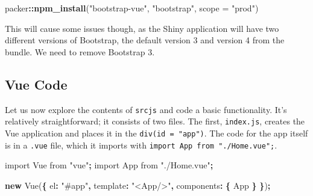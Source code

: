 \documentclass[10pt,]{krantz}
\makeatletter
\newenvironment{Shaded}{\begin{snugshade}}{\end{snugshade}}
\newcommand{\AttributeTok}[1]{\textcolor[rgb]{0.61,0.61,0.61}{#1}}
\newcommand{\CommentTok}[1]{\textcolor[rgb]{0.37,0.37,0.37}{\textit{#1}}}
\newcommand{\ControlFlowTok}[1]{\textcolor[rgb]{0.27,0.27,0.27}{\textbf{#1}}}
\newcommand{\DataTypeTok}[1]{\textcolor[rgb]{0.27,0.27,0.27}{#1}}
\newcommand{\ImportTok}[1]{#1}
\newcommand{\KeywordTok}[1]{\textcolor[rgb]{0.27,0.27,0.27}{\textbf{#1}}}
\newcommand{\NormalTok}[1]{#1}
\newcommand{\OperatorTok}[1]{\textcolor[rgb]{0.43,0.43,0.43}{\textbf{#1}}}
\newcommand{\StringTok}[1]{\textcolor[rgb]{0.5,0.5,0.5}{#1}}
\newenvironment{kframe}{%
\medskip{}
\setlength{\fboxsep}{.8em}
 \def\at@end@of@kframe{}%
 \ifinner\ifhmode%
  \def\at@end@of@kframe{\end{minipage}}%
  \begin{minipage}{\columnwidth}%
 \fi\fi%
 \def\FrameCommand##1{\hskip\@totalleftmargin \hskip-\fboxsep
 \colorbox{shadecolor}{##1}\hskip-\fboxsep
     \hskip-\linewidth \hskip-\@totalleftmargin \hskip\columnwidth}%
 \MakeFramed {\advance\hsize-\width
   \@totalleftmargin\z@ \linewidth\hsize
   \@setminipage}}%
 {\par\unskip\endMakeFramed%
 \at@end@of@kframe}
\renewenvironment{Shaded}{\begin{kframe}}{\end{kframe}}
\makeatother
\begin{document}
\begin{Shaded}
\begin{Highlighting}[]
\NormalTok{packer}\OperatorTok{::}\KeywordTok{npm_install}\NormalTok{(}\StringTok{"bootstrap-vue"}\NormalTok{, }\StringTok{"bootstrap"}\NormalTok{, }\DataTypeTok{scope =} \StringTok{"prod"}\NormalTok{)}
\end{Highlighting}
\end{Shaded}

This will cause some issues though, as the Shiny application will have two different versions of Bootstrap, the default version 3 and version 4 from the bundle. We need to remove Bootstrap 3.

\begin{Shaded}
\end{Shaded}

\hypertarget{packer-adv-shiny-vue-code}{%
\subsection{Vue Code}\label{packer-adv-shiny-vue-code}}

Let us now explore the contents of \texttt{srcjs} and code a basic functionality. It's relatively straightforward; it consists of two files. The first, \texttt{index.js}, creates the Vue application and places it in the \texttt{div(id\ =\ "app")}. The code for the app itself is in a \texttt{.vue} file, which it imports with \texttt{import\ App\ from\ "./Home.vue";}.

\begin{Shaded}
\begin{Highlighting}[]
\ImportTok{import}\NormalTok{ Vue }\ImportTok{from} \StringTok{"vue"}\OperatorTok{;}
\ImportTok{import}\NormalTok{ App }\ImportTok{from} \StringTok{"./Home.vue"}\OperatorTok{;}

\KeywordTok{new} \AttributeTok{Vue}\NormalTok{(}\OperatorTok{\{}
  \DataTypeTok{el}\OperatorTok{:} \StringTok{"#app"}\OperatorTok{,}
  \DataTypeTok{template}\OperatorTok{:} \StringTok{"<App/>"}\OperatorTok{,}
  \DataTypeTok{components}\OperatorTok{:} \OperatorTok{\{}\NormalTok{ App }\OperatorTok{\}}
\OperatorTok{\}}\NormalTok{)}\OperatorTok{;}
\end{Highlighting}
\end{Shaded}
\end{document}
